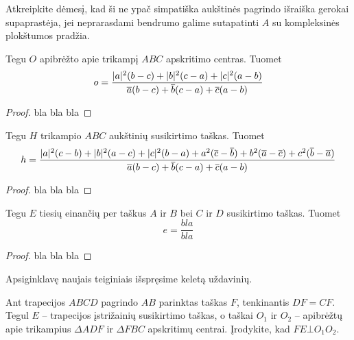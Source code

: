 \documentclass[11pt,a4paper,twoside]{book}
\begin{document}
Atkreipkite dėmesį, kad ši ne ypač simpatiška aukštinės pagrindo išraiška
gerokai supaprastėja, jei neprarasdami bendrumo galime sutapatinti $A$ su
kompleksinės plokštumos pradžia.

\begin{teig}
  Tegu $O$ apibrėžto apie trikampį $ABC$ apskritimo centras. Tuomet
  $$
  o = \frac{|a|^2(b-c) + |b|^2(c-a) + |c|^2(a-b)}{\overline{a}(b-c) + \overline{b}(c-a) +
  \overline{c}(a-b)}
  $$
\end{teig}

\begin{proof}
  bla bla bla
\end{proof}

\begin{teig}
  Tegu $H$ trikampio $ABC$ aukštinių susikirtimo taškas. Tuomet
  $$
  h = \frac{|a|^2(c-b) + |b|^2(a-c) + |c|^2(b-a) + a^2(\overline{c}-\overline{b}) +
  b^2(\overline{a}-\overline{c}) + c^2(\overline{b}-\overline{a})}{\overline{a}(b-c) + \overline{b}(c-a) +
  \overline{c}(a-b)}
  $$
\end{teig}

\begin{proof}
  bla bla bla
\end{proof}

\begin{teig}
  Tegu $E$ tiesių einančių per taškus $A$ ir $B$ bei $C$ ir $D$ susikirtimo
  taškas. Tuomet
  $$
  e = \frac{bla}{bla}
  $$
\end{teig}

\begin{proof}
  bla bla bla
\end{proof}

Apsiginklavę naujais teiginiais išspręsime keletą uždavinių.

\begin{pav}
  Ant trapecijos $ABCD$ pagrindo $AB$ parinktas taškas $F$, tenkinantis $DF =
  CF$.  Tegul $E$ -- trapecijos įstrižainių susikirtimo taškas, o taškai $O_1$
  ir $O_2$ -- apibrėžtų apie trikampius $ \Delta ADF$ ir $\Delta FBC$ apskritimų
  centrai. Įrodykite, kad $ FE \bot O_1 O_2 $.
\end{pav}
\end{document}
